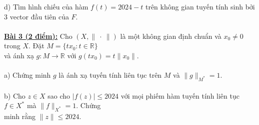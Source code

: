 \documentclass[10pt, a4paper]{article}
\begin{document}
\color{red}d) \color{black}Tìm hình chiếu của hàm $f(t)=2024-t$ trên không gian tuyến tính sinh bởi 3 vector đầu tiên của $F$.\\\\
\color{red}\underline{\textbf{Bài 3 (2 điểm):}} \color{black}Cho $(X,\lVert~\cdot~\rVert)$ là một không gian định chuẩn và $x_0\ne0$ trong $X$. Đặt $M=\{tx_0:t\in\mathbb R\}$\\ và ánh xạ $g:M\to\mathbb R$ với $g(tx_0)=t\lVert x_0\rVert$.\\\\
\color{red}a) \color{black}Chứng minh $g$ là ánh xạ tuyến tính liên tục trên $M$ và $\lVert g\rVert_{M^*}=1$.\\\\
\color{red}b) \color{black}Cho $z\in X$ sao cho $|f(z)|\le 2024$ với mọi phiếm hàm tuyến tính liên tục $f\in X^*$ mà $\lVert f\rVert_{X^*}=1$. Chứng\\ minh rằng $\lVert z\rVert\le 2024$.
\end{document}
